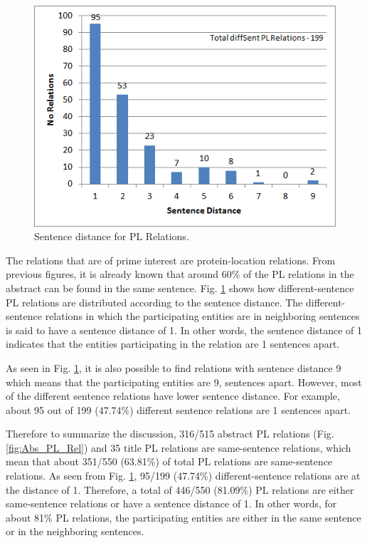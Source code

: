 \begin{figure}
\centering
\includegraphics[scale=0.9]{figures/SentenceDistance_PLRel.png}
\caption{Sentence distance for PL Relations.}\label{fig:SentDistancePL}
\end{figure}

The relations that are of prime interest are protein-location relations. From previous figures, it is already known that around 60\% of the PL relations in the abstract can be found in the same sentence. Fig. \ref{fig:SentDistancePL} shows how different-sentence PL relations are distributed according to the sentence distance. The different-sentence relations in which the participating entities are in neighboring sentences is said to have a sentence distance of 1. In other words, the sentence distance of 1 indicates that the entities participating in the relation are 1 sentences apart. 

As seen in Fig. \ref{fig:SentDistancePL}, it is also possible to find relations with sentence distance 9 which means that the participating entities are 9, sentences apart. However, most of the different sentence relations have lower sentence distance. For example, about 95 out of 199 (47.74\%) different sentence relations are 1 sentences apart.

Therefore to summarize the discussion, 316/515 abstract PL relations (Fig. \ref{fig:Abs_PL_Rel}) and 35 title PL relations are same-sentence relations, which mean that about 351/550 (63.81\%) of total PL relations are same-sentence relations. As seen from  Fig. \ref{fig:SentDistancePL}, 95/199 (47.74\%) different-sentence relations are at the distance of 1. Therefore, a total of 446/550 (81.09\%) PL relations are either same-sentence relations or have a sentence distance of 1. In other words, for about 81\% PL relations, the participating entities are either in the same sentence or in the neighboring sentences.

